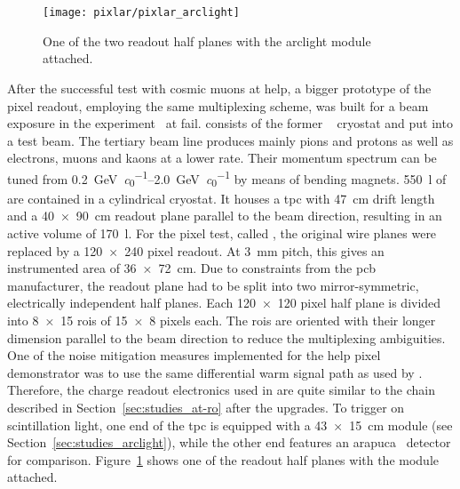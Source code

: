 \section{\pixlar{}}
\label{sec:ac_pixlar}

\begin{figure}[htb]
	\centering
	\texttt{[image: pixlar/pixlar\_arclight]}
	\caption[\pixlar{} half plane with attached  module]{%
		One of the two \pixlar{} readout half planes with the \acrshort{arclight} module attached.
	}
	\label{fig:pixlar_arclight}
\end{figure}

After the successful test with cosmic muons at \gls{help}, a bigger prototype of the pixel readout, employing the same multiplexing scheme, was built for a beam exposure in the \lariat{} experiment~\cite{lariat} at \gls{fail}.
\lariat{} consists of the former \argoneut{}~\cite{argoneut} cryostat and \lartpc{} put into a test beam.
The tertiary beam line produces mainly pions and protons as well as electrons, muons and kaons at a lower rate.
Their momentum spectrum can be tuned from \SIrange{0.2}{2.0}{\giga\electronvolt\per\clight} by means of bending magnets.
\SI{550}{\litre} of \lar{} are contained in a cylindrical cryostat.
It houses a \gls{tpc} with \SI{47}{\centi\metre} drift length and a \SI{40 x 90}{\centi\metre} readout plane parallel to the beam direction, resulting in an active volume of \SI{170}{\litre}.
For the pixel test, called \pixlar{}, the original wire planes were replaced by a \num{120 x 240} pixel readout.
At \SI{3}{\milli\metre} pitch, this gives an instrumented area of \SI{36 x 72}{\centi\metre}.
Due to constraints from the \gls{pcb} manufacturer, the readout plane had to be split into two mirror-symmetric, electrically independent half planes.
Each \num{120 x 120} pixel half plane is divided into \num{8 x 15} \glspl{roi} of \num{15 x 8} pixels each.
The \glspl{roi} are oriented with their longer dimension parallel to the beam direction to reduce the multiplexing ambiguities.
One of the noise mitigation measures implemented for the \gls{help} pixel demonstrator was to use the same differential warm signal path as used by \lariat{}.
Therefore, the charge readout electronics used in \pixlar{} are quite similar to the \AT{} chain described in Section~\ref{sec:studies_at-ro} after the upgrades.
To trigger on scintillation light, one end of the \gls{tpc} is equipped with a \SI{43 x 15}{\centi\metre} \AL{} module (see Section~\ref{sec:studies_arclight}), while the other end features an \gls{arapuca}~\cite{arapuca} detector for comparison.
Figure~\ref{fig:pixlar_arclight} shows one of the readout half planes with the \AL{} module attached.

